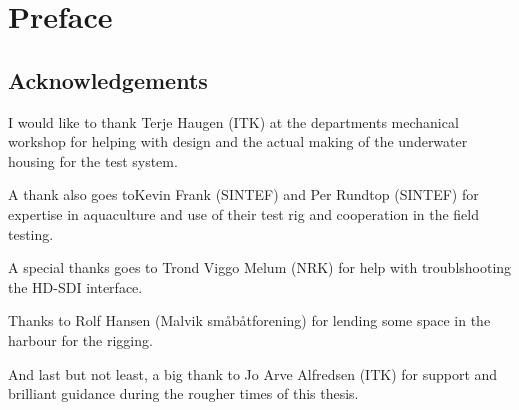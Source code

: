 
\chapter{Preface}


\section{Acknowledgements}

I would like to thank Terje Haugen (ITK) at the departments mechanical workshop for 
helping with design and the actual making of the underwater housing for the test system.

A thank also goes toKevin Frank (SINTEF) and Per Rundtop (SINTEF) for expertise 
in aquaculture and use of their test rig and cooperation in the field testing. 

A special thanks goes to Trond Viggo Melum (NRK) for help with troublshooting the HD-SDI interface.

Thanks to Rolf Hansen (Malvik småbåtforening) for lending some space in the harbour for the rigging.

And last but not least, a big thank to Jo Arve Alfredsen (ITK) for support and 
brilliant guidance during the rougher times of this thesis.